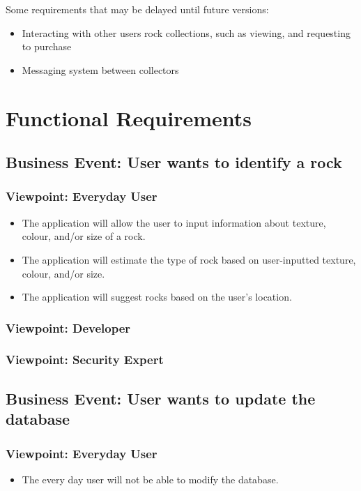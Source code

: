 \documentclass[titlepage]{article}
\begin{document}
Some requirements that may be delayed until future versions:

\begin{itemize}
\item Interacting with other users rock collections, such as viewing, and requesting to purchase \\
\item Messaging system between collectors \\
\end{itemize}
\section{Functional Requirements}
\label{sec:functional_requirements}
\subsection {Business Event: User wants to identify a rock}
	\subsubsection {Viewpoint: Everyday User}
		\begin{itemize}
			\item The application will allow the user to input information about texture, colour, and/or size of a rock.
			\item The application will estimate the type of rock based on user-inputted texture, colour, and/or size.
			\item The application will suggest rocks based on the user's location.
		\end{itemize}
	\subsubsection {Viewpoint: Developer}
	\subsubsection {Viewpoint: Security Expert}
\subsection {Business Event: User wants to update the database}
	\subsubsection {Viewpoint: Everyday User}
		\begin{itemize}
			\item The every day user will not be able to modify the database.
		\end{itemize}
\end{document}
